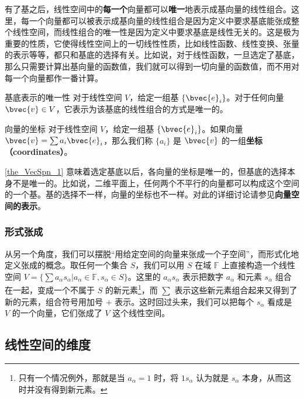 有了基之后，线性空间中的\textbf{每一个}向量都可以\textbf{唯一}地表示成基向量的线性组合。这里，每一个向量都可以被表示成基向量的线性组合是因为定义中要求基底能张成整个线性空间，而线性组合的唯一性是因为定义中要求基底是线性无关的。这是极为重要的性质，它使得线性空间上的一切线性性质，比如线性函数、线性变换、张量的表示等等，都只和基底的选择有关。比如说，对于线性函数，一旦选定了基底，那么只需要计算出基向量的函数值，我们就可以得到一切向量的函数值，而不用对每一个向量都作一番计算。

\begin{theorem}{基底表示的唯一性}\label{the_VecSpn_1}
对于线性空间 $V$，给定一组基 $\{\bvec{e}_i\}$。对于任何向量 $\bvec{v}\in V$，它表示为该基底的线性组合的方式是唯一的。
\end{theorem}

\begin{definition}{向量的坐标}
对于线性空间 $V$，给定一组基 $\{\bvec{e}_i\}$。如果向量 $\bvec{v}=\sum a_i\bvec{e}_i$，那么我们称 $\{a_i\}$ 是 $\bvec{v}$ 的一组\textbf{坐标（coordinates）}。
\end{definition}

\autoref{the_VecSpn_1} 意味着选定基底以后，各向量的坐标是唯一的，但基底的选择本身不是唯一的。比如说，二维平面上，任何两个不平行的向量都可以构成这个空间的一个基。基的选择不一样，向量的坐标也不一样。对此的详细讨论请参见\textbf{向量空间的表示}。


\subsubsection{形式张成}

从另一个角度，我们可以摆脱“用给定空间的向量来张成一个子空间”，而形式化地定义张成的概念。取任何一个集合 $S$，我们可以用 $S$ 在域 $\mathbb{F}$ 上直接构造一个线性空间 $V=\{\sum a_\alpha s_\alpha|a_\alpha\in\mathbb{F}, s_\alpha\in S\}$。这里的 $a_\alpha s_\alpha$ 表示把数字 $a_\alpha$ 和元素 $s_\alpha$ 组合在一起，变成一个不属于 $S$ 的新元素\footnote{只有一个情况例外，那就是当 $a_\alpha=1$ 时，将 $1s_\alpha$ 认为就是 $s_\alpha$ 本身，从而这时并没有得到新元素。}，而 $\sum$ 表示这些新元素组合起来又得到了新的元素，组合符号用加号 $+$ 表示。这时回过头来，我们可以把每个 $s_\alpha$ 看成是 $V$ 的一个向量，它们张成了 $V$ 这个线性空间。


\subsection{线性空间的维度}



